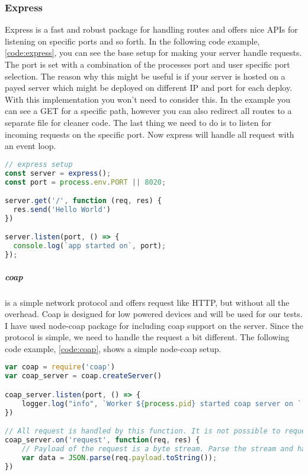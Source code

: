 \documentclass[USenglish]{ifimaster}  %
\begin{document}
\subsubsection{Express}
Express is a fast and robust package for handling routes and offers nice APIs for listening on specific ports and so forth. In the following code example, \ref{code:express}, you can see the base setup for making your server handle requests. The port is set with a combination of the processes port and user specific port selection. The reason why this might be useful is if your server is hosted on a payed server which might be deployed on different IP and port for each deploy. With this implementation you won't need to consider this. In the example you can see a GET for a specific path, however you can also redirect all routes to a separate file for cleaner code. The last thing we need to do is to listen for incoming requests on the specific port. Now express will handle all request with an event loop.

\begin{lstlisting}[caption={Base express setup},label={code:express},language=JavaScript]
// express setup
const server = express();
const port = process.env.PORT || 8020;

server.get('/', function (req, res) {
  res.send('Hello World')
})

server.listen(port, () => {
  console.log(`app started on`, port);
});
\end{lstlisting}

\subparagraph{\acrfull{coap}} is a simple network protocol and offers request like HTTP, but without all the overhead. Coap is designed for low powered devices and will be used for our tests. I have used node-coap package for including \acrshort{coap} support on the server. Since the protocol is simple, we need to handle the request a bit different. The following code example, \vref{code:coap}, shows a simple node-coap setup.

\begin{lstlisting}[caption={Base \acrshort{coap} setup},label={code:coap},language=JavaScript]
var coap = require('coap')
var coap_server = coap.createServer()

coap_server.listen(port, () => {
    logger.log("info", `Worker ${process.pid} started coap server on ` + port);
})

// All request is handled by this function. It is not possible to request a specific url path
coap_server.on('request', function(req, res) {
    // Payload of the request is a byte stream. Parse the stream and handle the data
    var data = JSON.parse(req.payload.toString());
})
\end{lstlisting}
\end{document}
